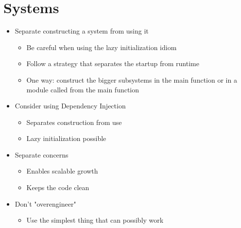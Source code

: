 \section{Systems}
\begin{itemize}
    \item Separate constructing a system from using it
    \begin{itemize}
        \item Be careful when using the lazy initialization idiom
        \item Follow a strategy that separates the startup from runtime
        \item One way: construct the bigger subsystems in the main function or in a module called from the main function
    \end{itemize}
    \item Consider using Dependency Injection
    \begin{itemize}
        \item Separates construction from use
        \item Lazy initialization possible
    \end{itemize}
    \item Separate concerns
    \begin{itemize}
        \item Enables scalable growth
        \item Keeps the code clean
    \end{itemize}
    \item Don't "overengineer"
    \begin{itemize}
        \item Use the simplest thing that can possibly work
    \end{itemize}
\end{itemize}
